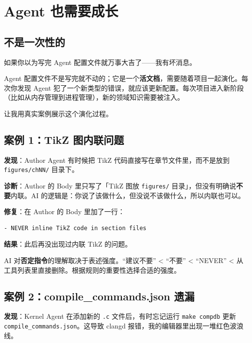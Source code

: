 \chapter{Agent 也需要成长}

\section{不是一次性的}

如果你以为写完 Agent 配置文件就万事大吉了——我有坏消息。

Agent 配置文件不是写完就不动的；它是一个\textbf{活文档}，需要随着项目一起演化。每次你发现 Agent 犯了一个新类型的错误，就应该更新配置。每次项目进入新阶段（比如从内存管理到进程管理），新的领域知识需要被注入。

让我用真实案例展示这个演化过程。

\section{案例 1：TikZ 图内联问题}

\textbf{发现}：Author Agent 有时候把 TikZ 代码直接写在章节文件里，而不是放到 \texttt{figures/chNN/} 目录下。

\textbf{诊断}：Author 的 Body 里只写了「TikZ 图放 \texttt{figures/} 目录」，但没有明确说\textbf{不要}内联。AI 的逻辑是：你说了该做什么，但没说不该做什么，所以内联也可以。

\textbf{修复}：在 Author 的 Body 里加了一行：

\begin{lstlisting}[style=yamlstyle]
- NEVER inline TikZ code in section files
\end{lstlisting}

\textbf{结果}：此后再没出现过内联 TikZ 的问题。

\begin{promptbox}
AI 对\textbf{否定指令}的理解取决于表述强度。``建议不要'' < ``不要'' < ``NEVER'' < 从工具列表里直接删除。根据规则的重要性选择合适的强度。
\end{promptbox}

\section{案例 2：compile\_commands.json 遗漏}

\textbf{发现}：Kernel Agent 在添加新的 \texttt{.c} 文件后，有时忘记运行 \texttt{make compdb} 更新 \texttt{compile\_commands.json}。这导致 clangd 报错，我的编辑器里出现一堆红色波浪线。

